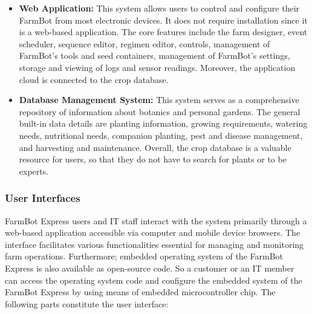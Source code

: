 \begin{itemize}
    \item \textbf{Web Application:} This system allows users to control and configure their FarmBot from most electronic devices. It does not require installation since it is a web-based application. The core features include the farm designer, event scheduler, sequence editor, regimen editor, controls, management of FarmBot's tools and seed containers, management of FarmBot's settings, storage and viewing of logs and sensor readings. Moreover, the application cloud is connected to the crop database.

    \item \textbf{Database Management System:} This system serves as a comprehensive repository of information about botanics and personal gardens. The general built-in data details are planting information, growing requirements, watering needs, nutritional needs, companion planting, pest and disease management, and harvesting and maintenance. Overall, the crop database is a valuable resource for users, so that they do not have to search for plants or to be experts.

\end{itemize}


\subsubsection{User Interfaces}


FarmBot Express users and IT staff interact with the system primarily through a web-based application accessible via computer and mobile device browsers. The interface facilitates various functionalities essential for managing and monitoring farm operations. Furthermore; embedded operating system of the FarmBot Express is also available as open-source code. So a customer or an IT member can access the operating system code and configure the embedded system of the FarmBot Express by using means of embedded microcontroller chip. The following parts constitute the user interface:

